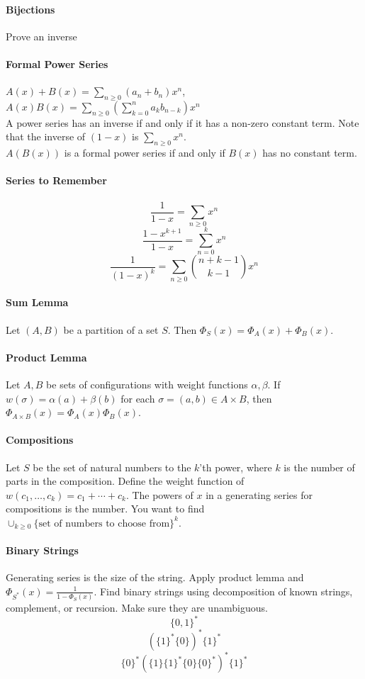 \documentclass[10pt,letter]{article}
\begin{document}
\paragraph{Bijections}
Prove an inverse

\paragraph{Formal Power Series}
$A(x)+B(x)=\sum_{n\geq0}(a_n+b_n)x^n$, $A(x)B(x)=\sum_{n\geq0}\left(\sum_{k=0}^na_kb_{n-k}\right)x^n$ \\ 
A power series has an inverse if and only if it has a non-zero constant term. Note that the inverse of $(1-x)$ is $\sum_{n\geq0}x^n$. \\ 
$A(B(x))$ is a formal power series if and only if $B(x)$ has no constant term. 

\paragraph{Series to Remember}
$$\frac{1}{1-x}=\sum_{n\geq0}x^n$$  
$$\frac{1-x^{k+1}}{1-x}=\sum_{n=0}^kx^n$$
$$\frac{1}{(1-x)^k}=\sum_{n\geq0}{n+k-1\choose k-1}x^n$$

\paragraph{Sum Lemma}
Let $(A,B)$ be a partition of a set $S$. Then $\Phi_S(x)=\Phi_A(x)+\Phi_B(x)$.
\paragraph{Product Lemma}
Let $A,B$ be sets of configurations with weight functions $\alpha,\beta$. If $w(\sigma)=\alpha(a)+\beta(b)$ for each $\sigma=(a,b)\in A\times B$, then $\Phi_{A\times B}(x)=\Phi_A(x)\Phi_B(x)$. 

\paragraph{Compositions}
Let $S$ be the set of natural numbers to the $k$'th power, where $k$ is the number of parts in the composition. Define the weight function of $w(c_1,\ldots,c_k)=c_1+\cdots+c_k$. The powers of $x$ in a generating series for compositions is the number. You want to find $\cup_{k\geq0}\{\text{set of numbers to choose from}\}^k$. 

\paragraph{Binary Strings}
Generating series is the size of the string. Apply product lemma and $\Phi_{S^*}(x)=\frac{1}{1-\Phi_S(x)}$. Find binary strings using decomposition of known strings, complement, or recursion. Make sure they are unambiguous.
$$\{0,1\}^*$$
$$(\{1\}^*\{0\})^*\{1\}^*$$
$$\{0\}^*(\{1\}\{1\}^*\{0\}\{0\}^*)^*\{1\}^*$$
\end{document}
